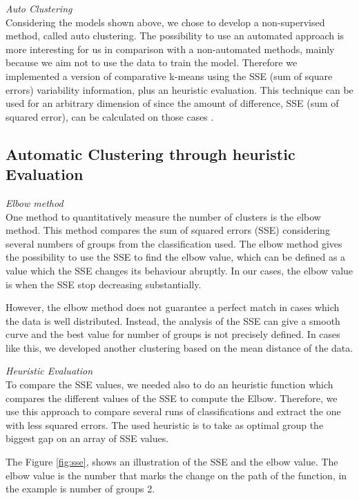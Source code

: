     
\textit{Auto Clustering}\\
Considering the models shown above, we chose to develop a non-supervised method, called auto clustering. The possibility to use an automated approach is more interesting for us in comparison with a non-automated methods, mainly because we aim not to use the data to train the model. Therefore we implemented a version of comparative k-means using the SSE (sum of square errors) variability information, plus an heuristic evaluation. This technique can be used for an arbitrary dimension of since the amount of difference, SSE (sum of squared error), can be calculated on those cases \cite{multi_dimentionals_sse}.
    
\subsection{\textbf{Automatic Clustering through heuristic Evaluation}}

    \textit{Elbow method}\\
    One method to quantitatively measure the number of clusters is the elbow method. This method compares the sum of squared errors (SSE) considering several numbers of groups from the classification used. 
    The elbow method gives the possibility to use the SSE to find the elbow value, which can be defined as a value which the SSE changes its behaviour abruptly. In our cases, the elbow value is when the SSE stop decreasing substantially.
    
    However, the elbow method does not guarantee a perfect match in cases which the data is well distributed. Instead, the analysis of the SSE can give a smooth curve and the best value for number of groups is not precisely defined. In cases like this, we developed another clustering based on the mean distance of the data.
    
    \textit{Heuristic Evaluation}\\
    To compare the SSE values, we needed also to do an heuristic function which compares the different values of the SSE to compute the Elbow. 
    Therefore, we use this approach to compare several runs of classifications and extract the one with less squared errors. The used heuristic is to take as optimal group the biggest gap on an array of SSE values. 
    
    The Figure \ref{fig:sse}, shows an illustration of the SSE and the elbow value. The elbow value is the number that marks the change on the path of the function, in the example is number of groups 2.
    
